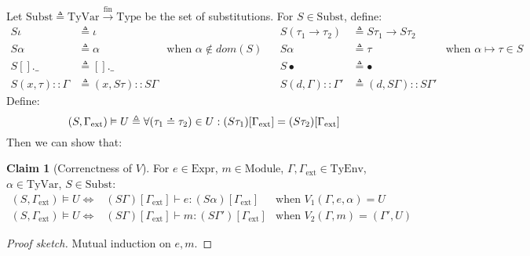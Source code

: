 \documentclass{article}
\theoremstyle{definition}
\newtheorem{clm}{Claim}[section]
\newcommand*{\cons}{::}
\newcommand*{\A}[1]{\overset{\,_{\mbox{\Large .}}}{#1}}
\newcommand*{\Expr}{\text{Expr}}
\newcommand*{\Module}{\text{Module}}
\newcommand*{\modid}{d}
\newcommand*{\fin}[2]{{#1}\xrightarrow{\text{fin}}{#2}}
\newcommand*{\TyEnv}{\text{TyEnv}}
\newcommand*{\TyVar}{\text{TyVar}}
\newcommand*{\Type}{\text{Type}}
\newcommand*{\Subst}{\text{Subst}}
\newcommand*{\external}{\Gamma_{\text{ext}}}
\begin{document}
Let $\Subst\triangleq\fin{\TyVar}{\Type}$ be the set of substitutions.
For $S\in\Subst$, define:
\begin{align*}
  S\iota               & \triangleq\iota                  &                                  &  & S(\tau_1\rightarrow\tau_2)   & \triangleq S\tau_1\rightarrow S\tau_2                                         \\
  S\alpha              & \triangleq\alpha                 & \text{when }\alpha\not\in dom(S) &  & S\alpha                      & \triangleq \tau                          & \text{when }\alpha\mapsto\tau\in S \\
  S[].\_               & \triangleq [].\_                 &                                  &  & S\bullet                     & \triangleq\bullet                                                             \\
  S(x,\tau)\cons\Gamma & \triangleq(x,S\tau)\cons S\Gamma &                                  &  & S(\modid,\Gamma)\cons\Gamma' & \triangleq(\modid,S\Gamma)\cons S\Gamma'
\end{align*}
Define:
\[(S,\external)\vDash U\triangleq\forall(\tau_1\A{=}\tau_2)\in U:(S\tau_1)[\external]= (S\tau_2)[\external]\]
Then we can show that:
\begin{clm}[Correnctness of $V$]
  For $e\in\Expr$, $m\in\Module$, $\Gamma,\external\in\TyEnv$, $\alpha\in\TyVar$, $S\in\Subst$:
  \begin{align*}
    (S,\external)\vDash U \Leftrightarrow & (S\Gamma)[\external]\vdash e:(S\alpha)[\external]  & \text{when }V_1(\Gamma,e,\alpha)=U    \\
    (S,\external)\vDash U \Leftrightarrow & (S\Gamma)[\external]\vdash m:(S\Gamma')[\external] & \text{when }V_2(\Gamma,m)=(\Gamma',U)
  \end{align*}
\end{clm}
\begin{proof}[Proof sketch]
  Mutual induction on $e,m$.
\end{proof}
\end{document}
